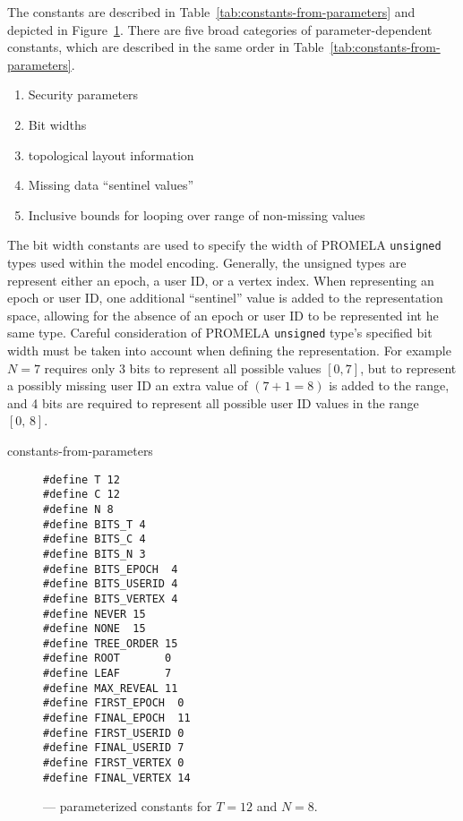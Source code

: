 The constants are described in Table\ \ref{tab:constants-from-parameters} and depicted in Figure\ \ref{fig:Encoded-Constants}.
There are five broad categories of parameter-dependent constants, which are described in the same order in Table\ \ref{tab:constants-from-parameters}.

\begin{enumerate}
\item Security parameters
\item Bit widths
\item {} topological layout information
\item Missing data ``sentinel values''
\item Inclusive bounds for looping over range of non-missing values
\end{enumerate}

The bit width constants are used to specify the width of PROMELA \texttt{unsigned} types used within the model encoding.
Generally, the unsigned types are represent either an epoch, a user ID, or a  vertex index.
When representing an epoch or user ID, one additional ``sentinel'' value is added to the representation space, allowing for the absence of an epoch or user ID to be represented int he same type.
Careful consideration of PROMELA \texttt{unsigned} type's specified bit width must be taken into account when defining the representation.
For example \(N=7\) requires only 3 bits to represent all possible values \([0,7]\), but to represent a possibly missing user ID an extra value of \((7 + 1 = 8)\) is added to the range, and 4 bits are required to represent all possible user ID values in the range \([0,\, 8]\).

\begin{table}[ht!]
\centering
\caption{%
\label{tab:constants-from-parameters}%
Derivation constants in  model from parameters\(T\) and \(N\).
}%
{constants-from-parameters}
\end{table}
    
\begin{figure}[ht!]
  \centering
  \caption{\label{fig:Encoded-Constants}\CGKAmod{}{}{} --- parameterized constants for \(T=12\) and \(N=8\).}
\begin{verbatim}
#define T 12
#define C 12
#define N 8
#define BITS_T 4
#define BITS_C 4
#define BITS_N 3
#define BITS_EPOCH  4
#define BITS_USERID 4
#define BITS_VERTEX 4
#define NEVER 15
#define NONE  15
#define TREE_ORDER 15
#define ROOT       0
#define LEAF       7
#define MAX_REVEAL 11
#define FIRST_EPOCH  0
#define FINAL_EPOCH  11
#define FIRST_USERID 0
#define FINAL_USERID 7
#define FIRST_VERTEX 0
#define FINAL_VERTEX 14
\end{verbatim}
\end{figure}

